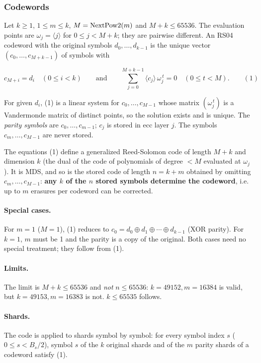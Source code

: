 \subsubsection{Codewords}
\label{rs04-codeword}

Let $k \ge 1$, $1 \le m \le k$, $M = {\rm NextPow2}(m)$ and $M + k \le 65536$.
The evaluation points are $\omega_j = \langle j \rangle$ for
$0 \le j < M + k$; they are pairwise different. An RS04 codeword with the
original symbols $d_0, \ldots, d_{k-1}$ is the unique vector
$(c_0, \ldots, c_{M+k-1})$ of symbols with

\[ c_{M+i} = d_i \quad (0 \le i < k) \qquad \mbox{and} \qquad
   \sum_{j=0}^{M+k-1} \langle c_j \rangle \, \omega_j^{\,t} = 0
   \quad (0 \le t < M). \qquad (1)\]

For given $d_i$, (1) is a linear system for $c_0, \ldots, c_{M-1}$ whose
matrix $(\omega_j^{\,t})$ is a Vandermonde matrix of distinct points, so
the solution exists and is unique. The {\em parity symbols} are
$c_0, \ldots, c_{m-1}$; $c_j$ is stored in ecc layer $j$. The symbols
$c_m, \ldots, c_{M-1}$ are never stored.

\medskip

The equations (1) define a generalized Reed-Solomon code of length $M+k$ and
dimension $k$ (the dual of the code of polynomials of degree $< M$ evaluated
at $\omega_j$). It is MDS, and so is the stored code of length $n = k + m$
obtained by omitting $c_m, \ldots, c_{M-1}$: {\bf any $k$ of the $n$ stored
symbols determine the codeword}, i.e. up to $m$ erasures per codeword can
be corrected.

\paragraph{Special cases.} For $m = 1$ ($M = 1$), (1) reduces to
$c_0 = d_0 \oplus d_1 \oplus \cdots \oplus d_{k-1}$ (XOR parity). For
$k = 1$, $m$ must be 1 and the parity is a copy of the original. Both
cases need no special treatment; they follow from (1).

\paragraph{Limits.} The limit is $M + k \le 65536$ and {\em not}
$n \le 65536$: $k = 49152, m = 16384$ is valid, but
$k = 49153, m = 16383$ is not. $k \le 65535$ follows.

\paragraph{Shards.} The code is applied to shards symbol by symbol: for
every symbol index $s$ ($0 \le s < B_s/2$), symbol $s$ of the $k$ original
shards and of the $m$ parity shards of a codeword satisfy (1).

